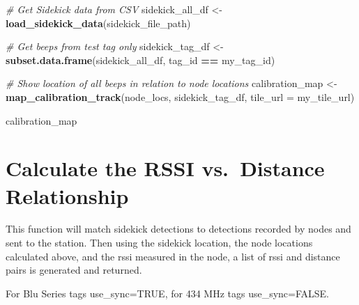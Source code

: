 \documentclass[
]{book}
\newenvironment{Shaded}{\begin{snugshade}}{\end{snugshade}}
\newcommand{\AttributeTok}[1]{\textcolor[rgb]{0.13,0.29,0.53}{#1}}
\newcommand{\CommentTok}[1]{\textcolor[rgb]{0.56,0.35,0.01}{\textit{#1}}}
\newcommand{\FunctionTok}[1]{\textcolor[rgb]{0.13,0.29,0.53}{\textbf{#1}}}
\newcommand{\NormalTok}[1]{#1}
\newcommand{\OtherTok}[1]{\textcolor[rgb]{0.56,0.35,0.01}{#1}}
\newcommand{\SpecialCharTok}[1]{\textcolor[rgb]{0.81,0.36,0.00}{\textbf{#1}}}
\begin{document}
\begin{Shaded}
\begin{Highlighting}[]
\CommentTok{\# Get Sidekick data from CSV}
\NormalTok{sidekick\_all\_df }\OtherTok{\textless{}{-}} \FunctionTok{load\_sidekick\_data}\NormalTok{(sidekick\_file\_path)}

\CommentTok{\# Get beeps from test tag only}
\NormalTok{sidekick\_tag\_df }\OtherTok{\textless{}{-}} \FunctionTok{subset.data.frame}\NormalTok{(sidekick\_all\_df, }
\NormalTok{                                     tag\_id }\SpecialCharTok{==}\NormalTok{ my\_tag\_id)}

\CommentTok{\# Show location of all beeps in relation to node locations}
\NormalTok{calibration\_map }\OtherTok{\textless{}{-}} \FunctionTok{map\_calibration\_track}\NormalTok{(node\_locs, }
\NormalTok{                                         sidekick\_tag\_df, }
                                         \AttributeTok{tile\_url =}\NormalTok{ my\_tile\_url)}

\NormalTok{calibration\_map}
\end{Highlighting}
\end{Shaded}

\section{Calculate the RSSI vs.~Distance Relationship}\label{calculate-the-rssi-vs.-distance-relationship}

This function will match sidekick detections to detections recorded by nodes and sent to the station. Then using the sidekick location, the node locations calculated above, and the rssi measured in the node, a list of rssi and distance pairs is generated and returned.

For Blu Series tags use\_sync=TRUE, for 434 MHz tags use\_sync=FALSE.
\end{document}
